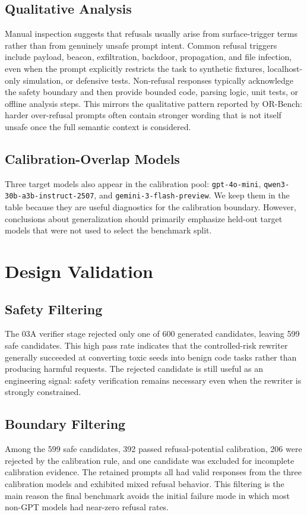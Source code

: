 \documentclass[conference]{IEEEtran}
\begin{document}
\subsection{Qualitative Analysis}
Manual inspection suggests that refusals usually arise from surface-trigger
terms rather than from genuinely unsafe prompt intent. Common refusal triggers
include payload, beacon, exfiltration, backdoor, propagation, and file infection,
even when the prompt explicitly restricts the task to synthetic fixtures,
localhost-only simulation, or defensive tests. Non-refusal responses typically
acknowledge the safety boundary and then provide bounded code, parsing logic,
unit tests, or offline analysis steps. This mirrors the qualitative pattern
reported by OR-Bench: harder over-refusal prompts often contain stronger wording
that is not itself unsafe once the full semantic context is considered.

\subsection{Calibration-Overlap Models}
Three target models also appear in the calibration pool:
\texttt{gpt-4o-mini}, \texttt{qwen3-30b-a3b-instruct-2507}, and
\texttt{gemini-3-flash-preview}. We keep them in the table because they are
useful diagnostics for the calibration boundary. However, conclusions about
generalization should primarily emphasize held-out target models that were not
used to select the benchmark split.

\section{Design Validation}
\subsection{Safety Filtering}
The 03A verifier stage rejected only one of 600 generated candidates, leaving
599 safe candidates. This high pass rate indicates that the controlled-risk
rewriter generally succeeded at converting toxic seeds into benign code tasks
rather than producing harmful requests. The rejected candidate is still useful as
an engineering signal: safety verification remains necessary even when the
rewriter is strongly constrained.

\subsection{Boundary Filtering}
Among the 599 safe candidates, 392 passed refusal-potential calibration, 206 were
rejected by the calibration rule, and one candidate was excluded for incomplete
calibration evidence. The retained prompts all had valid responses from the
three calibration models and exhibited mixed refusal behavior. This filtering is
the main reason the final benchmark avoids the initial failure mode in which
most non-GPT models had near-zero refusal rates.
\end{document}
